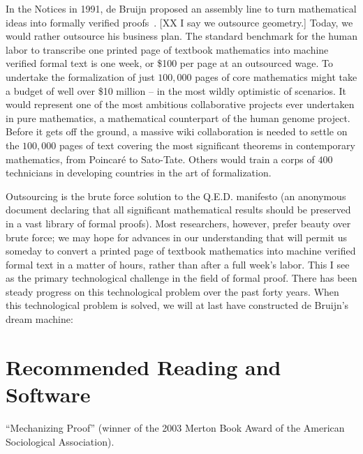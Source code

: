 \documentclass{llncs}
\begin{document}
In the Notices in 1991, de Bruijn proposed an assembly line
to turn mathematical ideas into formally verified proofs~\cite{dB91}. [XX I say we outsource geometry.]
Today, we would rather outsource his business plan. %
The standard benchmark for the
human labor to transcribe one printed page
of textbook mathematics into machine verified formal text is one week, or \$100 per page at an outsourced wage. To undertake the formalization of just $100,000$ pages
of core mathematics might take %
a budget of well over \$10 million -- in the most wildly optimistic of scenarios.  It would represent one of the most ambitious collaborative projects ever undertaken in pure mathematics, a mathematical counterpart of the human genome project.  Before it gets off the ground, a massive wiki collaboration is needed to
 settle on the $100,000$ pages
of text covering the most significant theorems in contemporary mathematics, from 
Poincar\'e to Sato-Tate.  Others would train a corps of $400$ technicians
in developing countries in the art of formalization.

Outsourcing is the brute force solution to the Q.E.D. manifesto
(an anonymous document declaring that all significant mathematical results should be preserved in a vast library of formal proofs).  Most researchers, however, prefer beauty over brute force;
we may hope for advances in our 
understanding that will permit us someday to convert a printed page of textbook mathematics into machine verified formal text in a matter of hours, rather than after a full week's labor.  This I see as the primary technological challenge in the field of formal
proof.  There has been steady progress on this technological problem over the past forty years.  When this technological problem is solved, we will at last have constructed de Bruijn's dream machine:





\section{Recommended Reading and Software}

``Mechanizing Proof''  (winner of the 2003 Merton Book Award of
the American Sociological Association).
\end{document}

